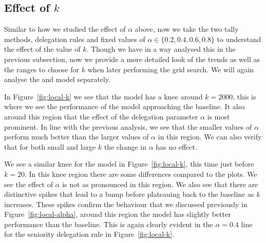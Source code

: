 \subsection{Effect of $k$}
Similar to how we studied the effect of $\alpha$ above, now we take the two tally methods, delegation rules and fixed values of $\alpha \in \{0.2,0.4,0.6,0.8\}$ to understand the effect of the value of $k$. Though we have in a way analysed this in the previous subsection, now we provide a more detailed look of the trends as well as the ranges to choose for $k$ when later performing the grid search. We will again analyse the \globalv and \localv model separately.

In Figure~\ref{fig:local-k} we see that the \globalv model has a knee around $k=2000$, this is where we see the performance of the model approaching the baseline. It also around this region that the effect of the delegation parameter $\alpha$ is most prominent. In line with the previous analysis, we see that the smaller values of $\alpha$ perform much better than the larger values of $\alpha$ in this region. We can also verify that for both small and large $k$ the change in $\alpha$ has no effect.

We see a similar knee for the \localv model in Figure~\ref{fig:local-k}, this time just before $k=20$. In this knee region there are some differences compared to the \globalv plots. We see the effect of $\alpha$ is not as pronounced in this region. We also see that there are distinctive spikes that lead to a bump before plateauing back to the baseline as $k$ increases. These spikes confirm the behaviour that we discussed previously in Figure~\ref{fig:local-alpha}, around this region the \localv model has slightly better performance than the baseline. This is again clearly evident in the $\alpha=0.4$ line for the seniority delegation rule in Figure~\ref{fig:local-k}.

